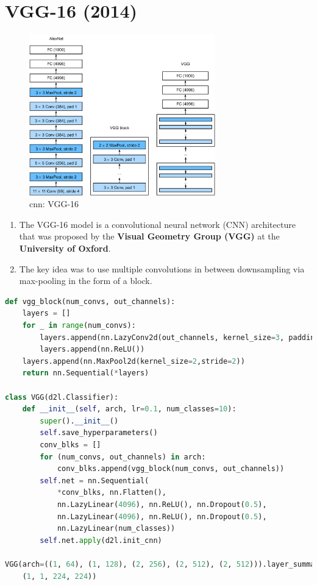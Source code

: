 \section{VGG-16 (2014) \cite{gfg-convolutional-neural-network-cnn-in-machine-learning,arxiv-1409.1556,gfg-vgg-16-cnn-model,dnn-1}}\label{cnn: VGG-16}

\begin{figure}[H]
    \centering
    \includegraphics[width=\linewidth, height=7cm, keepaspectratio]{Pictures/convolutional-neural-network/vgg.jpg}
    \caption*{cnn: VGG-16 \cite{dnn-1}}
\end{figure}

\begin{enumerate}
    \item The VGG-16 model is a convolutional neural network (CNN) architecture that was proposed by the \textbf{Visual Geometry Group (VGG)} at the \textbf{University of Oxford}.

    \item The key idea was to use multiple convolutions in between downsampling via max-pooling in the form of a block.

\end{enumerate}

\begin{lstlisting}[language=Python]
def vgg_block(num_convs, out_channels):
    layers = []
    for _ in range(num_convs):
        layers.append(nn.LazyConv2d(out_channels, kernel_size=3, padding=1))
        layers.append(nn.ReLU())
    layers.append(nn.MaxPool2d(kernel_size=2,stride=2))
    return nn.Sequential(*layers)

class VGG(d2l.Classifier):
    def __init__(self, arch, lr=0.1, num_classes=10):
        super().__init__()
        self.save_hyperparameters()
        conv_blks = []
        for (num_convs, out_channels) in arch:
            conv_blks.append(vgg_block(num_convs, out_channels))
        self.net = nn.Sequential(
            *conv_blks, nn.Flatten(),
            nn.LazyLinear(4096), nn.ReLU(), nn.Dropout(0.5),
            nn.LazyLinear(4096), nn.ReLU(), nn.Dropout(0.5),
            nn.LazyLinear(num_classes))
        self.net.apply(d2l.init_cnn)

VGG(arch=((1, 64), (1, 128), (2, 256), (2, 512), (2, 512))).layer_summary(
    (1, 1, 224, 224))
\end{lstlisting}

